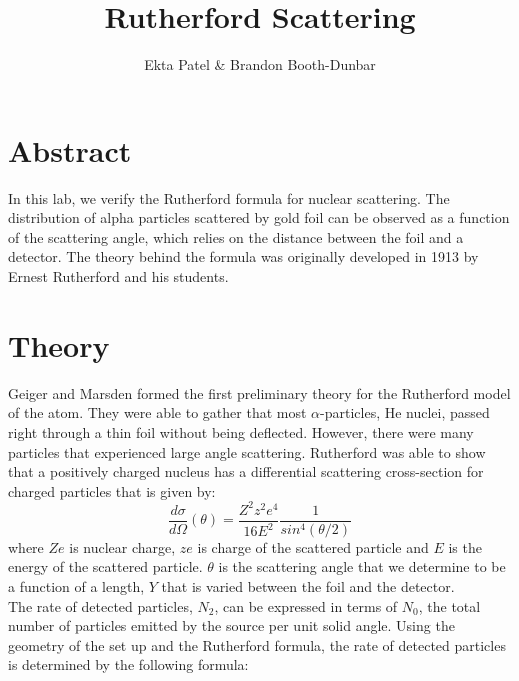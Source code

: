 
\newcommand{\ig}[2][width=4in]{\texttt{[image: \#2]}}    		
\usepackage{graphicx}					
\usepackage{amssymb}
\usepackage{pgfplotstable}
\usepackage{float}
\usepackage{caption}
\captionsetup[table]{justification=justified,singlelinecheck=false, position=bottom}


\header {\today}							
\title{Rutherford Scattering}
\author{Ekta Patel \& Brandon Booth-Dunbar}

\section{Abstract}
\begin{em} In this lab, we verify the Rutherford formula for nuclear scattering. The distribution of alpha particles scattered by gold foil can be observed as a function of the scattering angle, which relies on the distance between the foil and a detector. The theory behind the formula was originally developed in 1913 by Ernest Rutherford and his students. \end {em}

\section{Theory}
Geiger and Marsden formed the first preliminary theory for the Rutherford model of the atom. They were able to gather that most $\alpha$-particles, He nuclei, passed right through a thin foil without being deflected. However, there were many particles that experienced large angle scattering. Rutherford was able to show that a positively charged nucleus has a differential scattering cross-section for charged particles that is given by:
\begin {equation} \frac{d\sigma}{d\Omega}(\theta)= \frac{Z^2z^2e^4}{16E^2} \frac{1}{sin^4(\theta/2)}\end{equation} where $Ze$ is nuclear charge, $ze$ is charge of the scattered particle and $E$ is the energy of the scattered particle. $\theta$ is the scattering angle that we determine to be a function of a length, $Y$ that is varied between the foil and the detector.\\
\newline The rate of detected particles, $N_2$, can be expressed in terms of $N_0$, the total number of particles emitted by the source per unit solid angle. Using the geometry of the set up and the Rutherford formula, the rate of detected particles is determined by the following formula:

